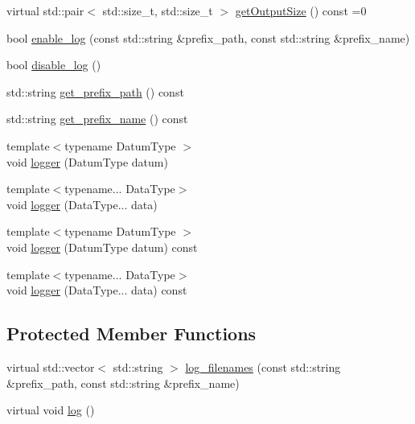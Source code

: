 \begin{DoxyCompactItemize}
\item 
virtual std\+::pair$<$ std\+::size\+\_\+t, std\+::size\+\_\+t $>$ \mbox{\hyperlink{classbfl_1_1MeasurementModel_a6cca2022b576c9dbb61e73b83a10c6ee}{get\+Output\+Size}} () const =0
\item 
bool \mbox{\hyperlink{classbfl_1_1Logger_ae94b97b6e8d7902e8ce048384813122e}{enable\+\_\+log}} (const std\+::string \&prefix\+\_\+path, const std\+::string \&prefix\+\_\+name)
\item 
bool \mbox{\hyperlink{classbfl_1_1Logger_a440467a28ccc46490d767fe0ef6f556a}{disable\+\_\+log}} ()
\item 
std\+::string \mbox{\hyperlink{classbfl_1_1Logger_a56cf1a4e712bf23d9978420a8a59a62b}{get\+\_\+prefix\+\_\+path}} () const
\item 
std\+::string \mbox{\hyperlink{classbfl_1_1Logger_a913a795b7bfbf378815eeb342d68a7c0}{get\+\_\+prefix\+\_\+name}} () const
\item 
{\footnotesize template$<$typename Datum\+Type $>$ }\\void \mbox{\hyperlink{classbfl_1_1Logger_a1033ff31398484f2132f84fd140da9e3}{logger}} (Datum\+Type datum)
\item 
{\footnotesize template$<$typename... Data\+Type$>$ }\\void \mbox{\hyperlink{classbfl_1_1Logger_aca2086c9256e5c404872b91f7f25b97d}{logger}} (Data\+Type... data)
\item 
{\footnotesize template$<$typename Datum\+Type $>$ }\\void \mbox{\hyperlink{classbfl_1_1Logger_a50b1c109730fa98f66e66f420f0158fe}{logger}} (Datum\+Type datum) const
\item 
{\footnotesize template$<$typename... Data\+Type$>$ }\\void \mbox{\hyperlink{classbfl_1_1Logger_a0f0cf7ce956546d94dfb1feb7cebf171}{logger}} (Data\+Type... data) const
\end{DoxyCompactItemize}
\subsection*{Protected Member Functions}
\begin{DoxyCompactItemize}
\item 
virtual std\+::vector$<$ std\+::string $>$ \mbox{\hyperlink{classbfl_1_1Logger_a328ceaa8e70e6918f11142b12b8be217}{log\+\_\+filenames}} (const std\+::string \&prefix\+\_\+path, const std\+::string \&prefix\+\_\+name)
\item 
virtual void \mbox{\hyperlink{classbfl_1_1Logger_ad44f46593cb8c4c87c1178eb326e2f64}{log}} ()
\end{DoxyCompactItemize}
